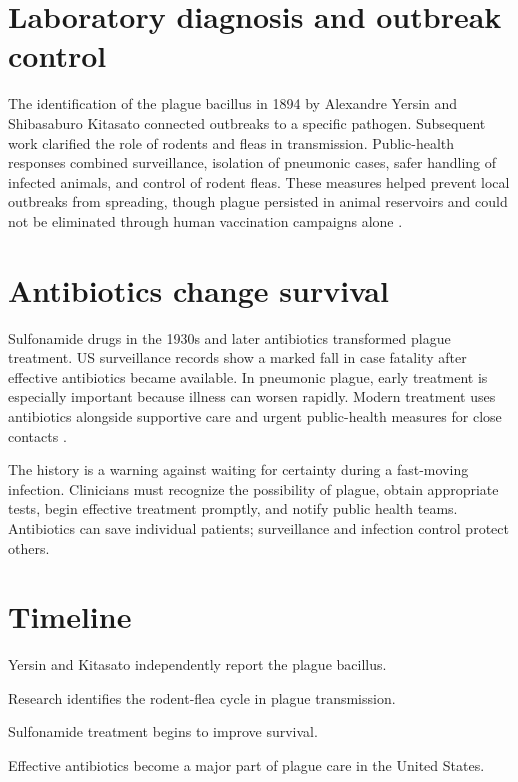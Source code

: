 \documentclass[12pt,oneside]{book}
\begin{document}
\section{Laboratory diagnosis and outbreak control}
The identification of the plague bacillus in 1894 by Alexandre Yersin and
Shibasaburo Kitasato connected outbreaks to a specific pathogen. Subsequent
work clarified the role of rodents and fleas in transmission. Public-health
responses combined surveillance, isolation of pneumonic cases, safer handling
of infected animals, and control of rodent fleas. These measures helped
prevent local outbreaks from spreading, though plague persisted in animal
reservoirs and could not be eliminated through human vaccination campaigns
alone \cite{cdcPlagueEpidemiology}.

\section{Antibiotics change survival}
Sulfonamide drugs in the 1930s and later antibiotics transformed plague
treatment. US surveillance records show a marked fall in case fatality after
effective antibiotics became available. In pneumonic plague, early treatment
is especially important because illness can worsen rapidly. Modern treatment
uses antibiotics alongside supportive care and urgent public-health measures
for close contacts \cite{cdcPlagueEpidemiology,cdcPlagueGuidelines}.

The history is a warning against waiting for certainty during a fast-moving
infection. Clinicians must recognize the possibility of plague, obtain
appropriate tests, begin effective treatment promptly, and notify public
health teams. Antibiotics can save individual patients; surveillance and
infection control protect others.

\section*{Timeline}
\begin{description}[leftmargin=2.3cm,style=nextline]
  \item[1894] Yersin and Kitasato independently report the plague bacillus.
  \item[1890s onward] Research identifies the rodent-flea cycle in plague transmission.
  \item[1930s] Sulfonamide treatment begins to improve survival.
  \item[1942 onward] Effective antibiotics become a major part of plague care in the United States.
\end{description}
\end{document}

